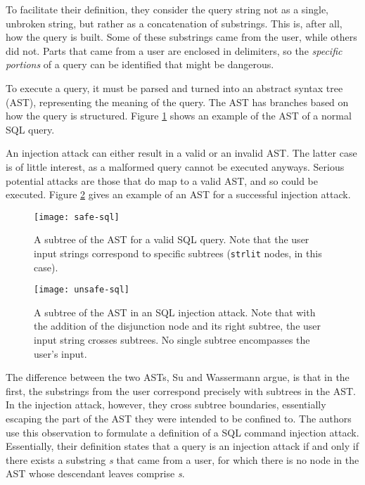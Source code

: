 \documentclass[twocolumn]{article}
\begin{document}
To facilitate their definition, they consider the query string not as a single, unbroken string, but rather as a concatenation of substrings.  This is, after all, how the query is built.  Some of these substrings came from the user, while others did not.  Parts that came from a user are enclosed in delimiters, so the \emph{specific portions} of a query can be identified that might be dangerous.

To execute a query, it must be parsed and turned into an abstract syntax tree (AST), representing the meaning of the query.  The AST has branches based on how the query is structured.  Figure \ref{fig:safe-sql-ast} shows an example of the AST of a normal SQL query.

An injection attack can either result in a valid or an invalid AST.  The latter case is of little interest, as a malformed query cannot be executed anyways.  Serious potential attacks are those that do map to a valid AST, and so could be executed.  Figure \ref{fig:unsafe-sql-ast} gives an example of an AST for a successful injection attack.

\begin{figure}
    \centering
    \texttt{[image: safe-sql]}
    \caption{A subtree of the AST for a valid SQL query.  Note that the user input strings correspond to specific subtrees (\texttt{strlit} nodes, in this case).}
    \label{fig:safe-sql-ast}
\end{figure}
\begin{figure}
    \texttt{[image: unsafe-sql]}
    \caption{A subtree of the AST in an SQL injection attack.  Note that with the addition of the disjunction node and its right subtree, the user input string crosses subtrees.  No single subtree encompasses the user's input.}
    \label{fig:unsafe-sql-ast}
\end{figure}

The difference between the two ASTs, Su and Wassermann argue, is that in the first, the substrings from the user correspond precisely with subtrees in the AST.  In the injection attack, however, they cross subtree boundaries, essentially escaping the part of the AST they were intended to be confined to.  The authors use this observation to formulate a definition of a SQL command injection attack.  Essentially, their definition states that a query is an injection attack if and only if there exists a substring \textit{s} that came from a user, for which there is no node in the AST whose descendant leaves comprise \textit{s}.\cite{su2006}
\end{document}
